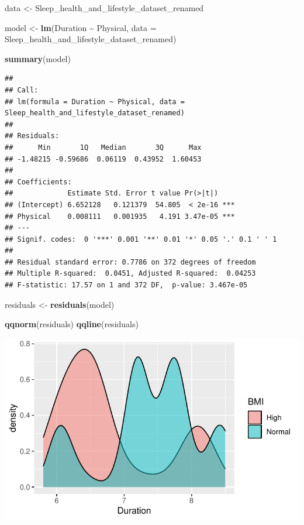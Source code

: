 \documentclass[
  11pt,
]{article}
\newenvironment{Shaded}{\begin{snugshade}}{\end{snugshade}}
\newcommand{\AttributeTok}[1]{\textcolor[rgb]{0.13,0.29,0.53}{#1}}
\newcommand{\FunctionTok}[1]{\textcolor[rgb]{0.13,0.29,0.53}{\textbf{#1}}}
\newcommand{\NormalTok}[1]{#1}
\newcommand{\OtherTok}[1]{\textcolor[rgb]{0.56,0.35,0.01}{#1}}
\newcommand{\SpecialCharTok}[1]{\textcolor[rgb]{0.81,0.36,0.00}{\textbf{#1}}}
\begin{document}
\begin{Shaded}
\begin{Highlighting}[]
\NormalTok{data }\OtherTok{\textless{}{-}}\NormalTok{ Sleep\_health\_and\_lifestyle\_dataset\_renamed}

\NormalTok{model }\OtherTok{\textless{}{-}} \FunctionTok{lm}\NormalTok{(Duration }\SpecialCharTok{\textasciitilde{}}\NormalTok{ Physical, }\AttributeTok{data =}\NormalTok{ Sleep\_health\_and\_lifestyle\_dataset\_renamed)}


\FunctionTok{summary}\NormalTok{(model)}
\end{Highlighting}
\end{Shaded}

\begin{verbatim}
## 
## Call:
## lm(formula = Duration ~ Physical, data = Sleep_health_and_lifestyle_dataset_renamed)
## 
## Residuals:
##      Min       1Q   Median       3Q      Max 
## -1.48215 -0.59686  0.06119  0.43952  1.60453 
## 
## Coefficients:
##             Estimate Std. Error t value Pr(>|t|)    
## (Intercept) 6.652128   0.121379  54.805  < 2e-16 ***
## Physical    0.008111   0.001935   4.191 3.47e-05 ***
## ---
## Signif. codes:  0 '***' 0.001 '**' 0.01 '*' 0.05 '.' 0.1 ' ' 1
## 
## Residual standard error: 0.7786 on 372 degrees of freedom
## Multiple R-squared:  0.0451, Adjusted R-squared:  0.04253 
## F-statistic: 17.57 on 1 and 372 DF,  p-value: 3.467e-05
\end{verbatim}

\begin{Shaded}
\begin{Highlighting}[]
\NormalTok{residuals }\OtherTok{\textless{}{-}} \FunctionTok{residuals}\NormalTok{(model)}

\FunctionTok{qqnorm}\NormalTok{(residuals)}
\FunctionTok{qqline}\NormalTok{(residuals)}
\end{Highlighting}
\end{Shaded}

\begin{center}\includegraphics[width=0.7\linewidth]{SleepHelath_files/figure-latex/unnamed-chunk-32-1} \end{center}
\end{document}

